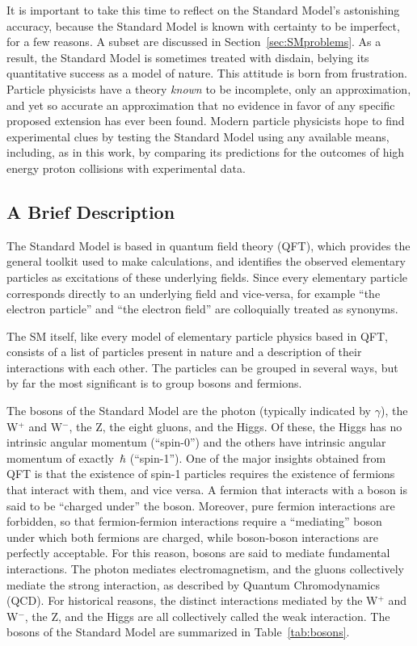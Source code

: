 It is important to take this time to reflect on the Standard Model's astonishing accuracy, because the Standard Model is known with certainty to be imperfect, for a few reasons. 
A subset are discussed in Section~\ref{sec:SMproblems}.
As a result, the Standard Model is sometimes treated with disdain, belying its quantitative success as a model of nature.
This attitude is born from frustration.
Particle physicists have a theory {\it known} to be incomplete, only an approximation, and yet so accurate an approximation that no evidence in favor of any specific proposed extension has ever been found.
Modern particle physicists hope to find experimental clues by testing the Standard Model using any available means, including, as in this work, by comparing its predictions for the outcomes of high energy proton collisions with experimental data.

  \subsection{A Brief Description} \label{sec:SMdescription}

  The Standard Model is based in quantum field theory (QFT), which provides the general toolkit used to make calculations, and identifies the observed elementary particles as excitations of these underlying fields.
  Since every elementary particle corresponds directly to an underlying field and vice-versa, for example ``the electron particle'' and ``the electron field'' are colloquially treated as synonyms.

  The SM itself, like every model of elementary particle physics based in QFT, consists of a list of particles present in nature and a description of their interactions with each other.
  The particles can be grouped in several ways, but by far the most significant is to group bosons and fermions.

  The bosons of the Standard Model are the photon (typically indicated by $\gamma$), the W$^+$ and W$^-$, the Z, the eight gluons, and the Higgs.
  Of these, the Higgs has no intrinsic angular momentum (``spin-0'') and the others have intrinsic angular momentum of exactly $\,\hbar$ (``spin-1'').
  One of the major insights obtained from QFT is that the existence of spin-1 particles requires the existence of fermions that interact with them, and vice versa.
  A fermion that interacts with a boson is said to be ``charged under'' the boson.
  Moreover, pure fermion interactions are forbidden, so that fermion-fermion interactions require a ``mediating'' boson under which both fermions are charged, while boson-boson interactions are perfectly acceptable.
  For this reason, bosons are said to mediate fundamental interactions.
  The photon mediates electromagnetism, and the gluons collectively mediate the strong interaction, as described by Quantum Chromodynamics (QCD).
  For historical reasons, the distinct interactions mediated by the W$^+$ and W$^-$, the Z, and the Higgs are all collectively called the weak interaction.
  The bosons of the Standard Model are summarized in Table~\ref{tab:bosons}.

